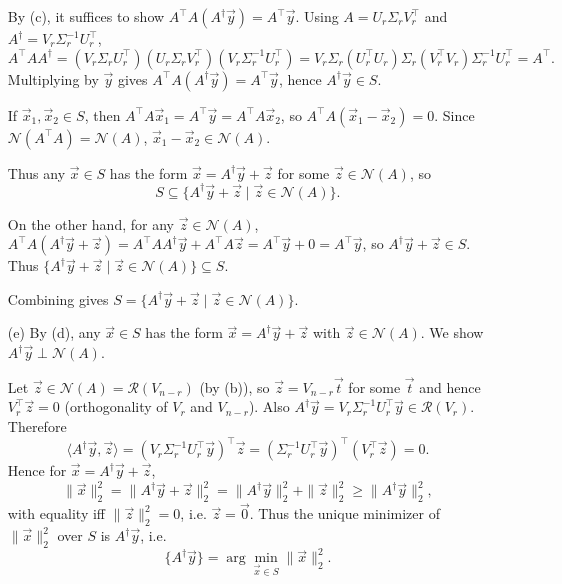 \documentclass[
  12pt,
]{fphw}
\begin{document}
\begin{enumerate}
By (c), it suffices to show $A^\top A(A^\dagger \vec y)=A^\top \vec y$.
Using $A=U_r\Sigma_r V_r^\top$ and $A^\dagger=V_r\Sigma_r^{-1}U_r^\top$,
\[
A^\top A A^\dagger
= (V_r\Sigma_r U_r^\top)(U_r\Sigma_r V_r^\top)(V_r\Sigma_r^{-1}U_r^\top)
= V_r\Sigma_r (U_r^\top U_r)\Sigma_r (V_r^\top V_r)\Sigma_r^{-1}U_r^\top
= A^\top.
\]
Multiplying by $\vec y$ gives $A^\top A(A^\dagger\vec y)=A^\top \vec y$, hence $A^\dagger \vec y\in S$.

If $\vec x_1, \vec x_2 \in S$, then $A^\top A\vec x_1=A^\top \vec y=A^\top A\vec x_2$, so $A^\top A(\vec x_1-\vec x_2)=0$.
Since $\mathcal{N}(A^\top A)=\mathcal{N}(A)$, $\vec x_1-\vec x_2 \in \mathcal{N}(A)$.

Thus any $\vec x\in S$ has the form $\vec x=A^\dagger \vec y + \vec z$ for some $\vec z\in\mathcal{N}(A)$, so
\[S \subseteq \{A^\dagger \vec y + \vec z \mid \vec z\in\mathcal{N}(A)\}.\] 

On the other hand, for any $\vec z\in\mathcal{N}(A)$, $A^\top A(A^\dagger \vec y + \vec z) = A^\top A A^\dagger \vec y + A^\top A \vec z = A^\top \vec y + 0 = A^\top \vec y$, so $A^\dagger \vec y + \vec z \in S$.
Thus $\{A^\dagger \vec y + \vec z \mid \vec z\in\mathcal{N}(A)\} \subseteq S$.

Combining gives $S = \{A^\dagger \vec y + \vec z \mid \vec z\in\mathcal{N}(A)\}$.


\item[(e)] By (d), any $\vec x\in S$ has the form $\vec x=A^\dagger\vec y+\vec z$ with $\vec z\in\mathcal{N}(A)$.
We show $A^\dagger\vec y \perp \mathcal{N}(A)$.

Let $\vec z\in\mathcal{N}(A)=\mathcal{R}(V_{n-r})$ (by (b)), so $\vec z=V_{n-r}\vec t$ for some $\vec t$ and hence
$V_r^\top \vec z = 0$ (orthogonality of $V_r$ and $V_{n-r}$).
Also $A^\dagger\vec y=V_r\Sigma_r^{-1}U_r^\top \vec y \in \mathcal{R}(V_r)$.
Therefore
\[
\langle A^\dagger\vec y,\vec z\rangle
= (V_r\Sigma_r^{-1}U_r^\top \vec y)^\top \vec z
= ( \Sigma_r^{-1}U_r^\top \vec y)^\top (V_r^\top \vec z)
= 0.
\]
Hence for $\vec x=A^\dagger\vec y+\vec z$,
\[
\|\vec x\|_2^2
= \|A^\dagger\vec y+\vec z\|_2^2
= \|A^\dagger\vec y\|_2^2 + \|\vec z\|_2^2
\ge \|A^\dagger\vec y\|_2^2,
\]
with equality iff $\|\vec z\|_2^2=0$, i.e. $\vec z=\vec 0$.
Thus the unique minimizer of $\|\vec x\|_2^2$ over $S$ is $A^\dagger\vec y$, i.e.
\[
\{A^\dagger\vec y\}=\arg\min_{\vec x\in S}\|\vec x\|_2^2.
\]
\end{enumerate}


\newpage
\end{document}

